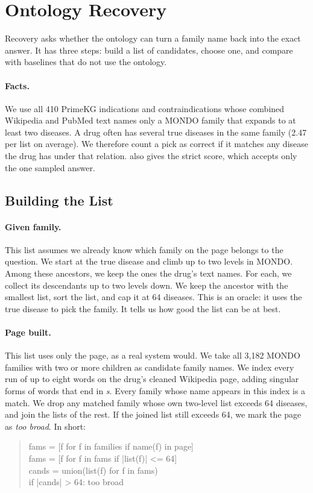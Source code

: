 \section{Ontology Recovery}
\label{app:recovery}

Recovery asks whether the ontology can turn a family name back into the exact answer. It has three steps: build a list of candidates, choose one, and compare with baselines that do not use the ontology.

\paragraph{Facts.}
We use all 410 PrimeKG indications and contraindications whose combined Wikipedia and PubMed text names only a MONDO family that expands to at least two diseases. A drug often has several true diseases in the same family (2.47 per list on average). We therefore count a pick as correct if it matches any disease the drug has under that relation.  also gives the strict score, which accepts only the one sampled answer.

\subsection{Building the List}

\paragraph{Given family.}
This list assumes we already know which family on the page belongs to the question. We start at the true disease and climb up to two levels in MONDO. Among these ancestors, we keep the ones the drug's text names. For each, we collect its descendants up to two levels down. We keep the ancestor with the smallest list, sort the list, and cap it at 64 diseases. This is an oracle: it uses the true disease to pick the family. It tells us how good the list can be at best.

\paragraph{Page built.}
This list uses only the page, as a real system would. We take all 3,182 MONDO families with two or more children as candidate family names. We index every run of up to eight words on the drug's cleaned Wikipedia page, adding singular forms of words that end in \emph{s}. Every family whose name appears in this index is a match. We drop any matched family whose own two-level list exceeds 64 diseases, and join the lists of the rest. If the joined list still exceeds 64, we mark the page as \emph{too broad}. In short:
\begin{quote}
\footnotesize\ttfamily
fams = [f for f in families if name(f) in page]\\
fams = [f for f in fams if |list(f)| <= 64]\\
cands = union(list(f) for f in fams)\\
if |cands| > 64: too broad
\end{quote}


